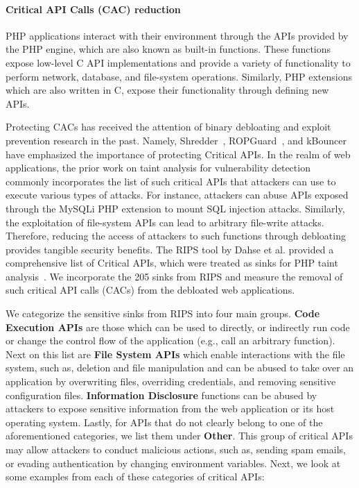 \paragraph{Critical API Calls (CAC) reduction} 
PHP applications interact with their environment through the APIs provided by the PHP engine, which are also known as built-in functions. 
These functions expose low-level C API implementations and provide a variety of functionality to perform network, database, and file-system operations. 
Similarly, PHP extensions which are also written in C, expose their functionality through defining new APIs. 

Protecting CACs has received the attention of binary debloating and exploit prevention research in the past. 
Namely, Shredder~\cite{mishra2018shredder}, ROPGuard~\cite{fratric2012ropguard}, and kBouncer~\cite{pappas2012kbouncer} have emphasized the importance of protecting Critical APIs. 
In the realm of web applications, the prior work on taint analysis for vulnerability detection commonly incorporates the list of such critical APIs that attackers can use to execute various types of attacks. 
For instance, attackers can abuse APIs exposed through the MySQLi PHP extension to mount SQL injection attacks. 
Similarly, the exploitation of file-system APIs can lead to arbitrary file-write attacks. 
Therefore, reducing the access of attackers to such functions through debloating provides tangible security benefits. The RIPS tool by Dahse et al. provided a comprehensive list of Critical APIs, which were treated as sinks for PHP taint analysis~\cite{dahse2010rips}. 
We incorporate the 205 sinks from RIPS and measure the removal of such critical API calls (CACs) from the debloated web applications. 

We categorize the sensitive sinks from RIPS into four main groups. \textbf{Code Execution APIs} are those which can be used to directly, or indirectly run code or change the control flow of the application (e.g., call an arbitrary function). 
Next on this list are \textbf{File System APIs} which enable interactions with the file system, such as, deletion and file manipulation and can be abused to take over an application by overwriting files, overriding credentials, and removing sensitive configuration files. 
\textbf{Information Disclosure} functions can be abused by attackers to expose sensitive information from the web application or its host operating system. 
Lastly, for APIs that do not clearly belong to one of the aforementioned categories, we list them under \textbf{Other}. 
This group of critical APIs may allow attackers to conduct malicious actions, such as, sending spam emails, or evading authentication by changing environment variables. 
Next, we look at some examples from each of these categories of critical APIs: 

